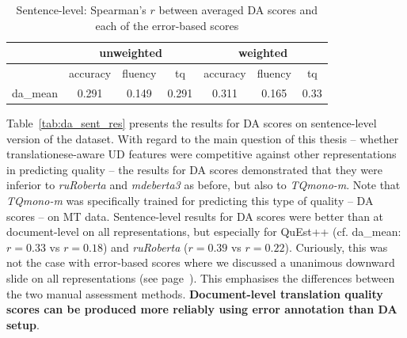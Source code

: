 \begin{table}[H]
	\centering
	\begin{tabular}{l|ccc|ccc}
		\toprule
		& \multicolumn{3}{c|}{unweighted} & \multicolumn{3}{c}{weighted} \\
		\midrule
		& accuracy   & fluency & tq    & accuracy & fluency & tq    \\
		\midrule
		da\_mean & 0.291 & 0.149 & 0.291 & 0.311 & 0.165 & 0.33 \\
		\bottomrule
	\end{tabular}
	\caption{\label{tab:sent_err-da_corr}Sentence-level: Spearman's $r$ between averaged DA scores and each of the error-based scores}
\end{table}

Table~\ref{tab:da_sent_res} presents the results for DA scores on sentence-level version of the dataset. 
With regard to the main question of this thesis -- whether translationese-aware UD features were competitive against other representations in predicting quality -- the results for DA scores demonstrated that they were inferior to \textit{ruRoberta} and \textit{mdeberta3} as before, but also to \textit{TQmono-m}. Note that \textit{TQmono-m} was specifically trained for predicting this type of quality -- DA scores -- on MT data. 
\label{pg:no_slide_for_da_when_moving_to_sent}
Sentence-level results for DA scores were better than at document-level on all representations, but especially for QuEst++ (cf. da\_mean: $r=0.33$ vs $r=0.18$) and \textit{ruRoberta} ($r=0.39$ vs $r=0.22$). Curiously, this was not the case with error-based scores where we discussed a unanimous downward slide on all representations (see page~\pageref{pg:downward_slide}). 
This emphasises the differences between the two manual assessment methods. \textbf{Document-level translation quality scores can be produced more reliably using error annotation than DA setup}. 
